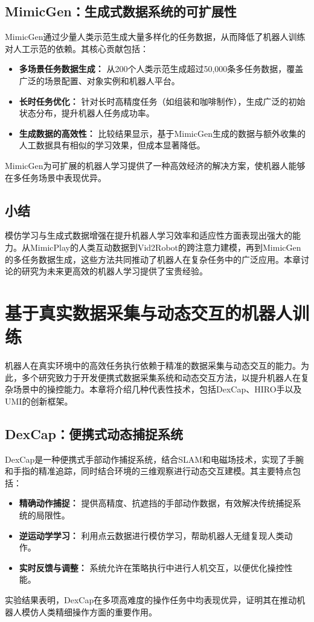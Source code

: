 \documentclass[a4paper]{article}
\begin{document}
\subsection{MimicGen：生成式数据系统的可扩展性}
MimicGen通过少量人类示范生成大量多样化的任务数据，从而降低了机器人训练对人工示范的依赖。其核心贡献包括：
\begin{itemize}
    \item \textbf{多场景任务数据生成：} 从200个人类示范生成超过50,000条多任务数据，覆盖广泛的场景配置、对象实例和机器人平台。
    \item \textbf{长时任务优化：} 针对长时高精度任务（如组装和咖啡制作），生成广泛的初始状态分布，提升机器人任务成功率。
    \item \textbf{生成数据的高效性：} 比较结果显示，基于MimicGen生成的数据与额外收集的人工数据具有相似的学习效果，但成本显著降低。
\end{itemize}
MimicGen为可扩展的机器人学习提供了一种高效经济的解决方案，使机器人能够在多任务场景中表现优异。

\subsection{小结}
模仿学习与生成式数据增强在提升机器人学习效率和适应性方面表现出强大的能力。从MimicPlay的人类互动数据到Vid2Robot的跨注意力建模，再到MimicGen的多任务数据生成，这些方法共同推动了机器人在复杂任务中的广泛应用。本章讨论的研究为未来更高效的机器人学习提供了宝贵经验。

\section{基于真实数据采集与动态交互的机器人训练}

机器人在真实环境中的高效任务执行依赖于精准的数据采集与动态交互的能力。为此，多个研究致力于开发便携式数据采集系统和动态交互方法，以提升机器人在复杂场景中的操控能力。本章将介绍几种代表性技术，包括DexCap、HIRO手以及UMI的创新框架。

\subsection{DexCap：便携式动态捕捉系统}
DexCap是一种便携式手部动作捕捉系统，结合SLAM和电磁场技术，实现了手腕和手指的精准追踪，同时结合环境的三维观察进行动态交互建模\cite{wang2024dexcap}。其主要特点包括：
\begin{itemize}
    \item \textbf{精确动作捕捉：} 提供高精度、抗遮挡的手部动作数据，有效解决传统捕捉系统的局限性。
    \item \textbf{逆运动学学习：} 利用点云数据进行模仿学习，帮助机器人无缝复现人类动作。
    \item \textbf{实时反馈与调整：} 系统允许在策略执行中进行人机交互，以便优化操控性能。
\end{itemize}
实验结果表明，DexCap在多项高难度的操作任务中均表现优异，证明其在推动机器人模仿人类精细操作方面的重要作用。
\end{document}
